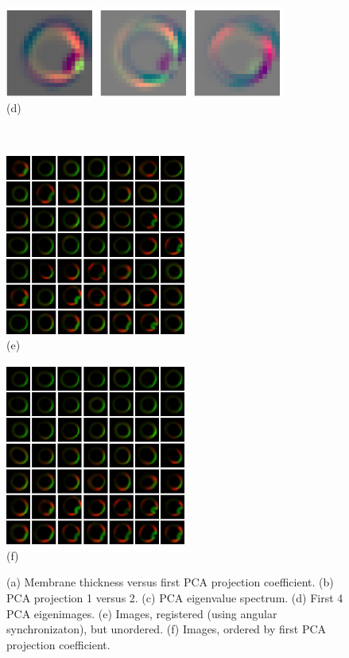 \documentclass[12pt]{article}
\begin{document}
\begin{figure}
\begin{minipage}{12.5cm}
\includegraphics[width=3cm]{eigenimage_2}
\includegraphics[width=3cm]{eigenimage_3}
\includegraphics[width=3cm]{eigenimage_4}\\
(d)
\end{minipage}\\
\begin{minipage}{6.2cm}
\centering
\includegraphics[width=6cm]{image_array}\\
(e)
\end{minipage}
\begin{minipage}{6.2cm}
\centering
\includegraphics[width=6cm]{image_array_ordered}\\
(f)
\end{minipage}
\caption{(a) Membrane thickness versus first PCA projection coefficient. (b) PCA projection 1 versus 2. (c) PCA eigenvalue spectrum. (d) First 4 PCA eigenimages. (e) Images, registered (using angular synchronizaton), but unordered. (f) Images, ordered by first PCA projection coefficient. }
\end{figure}
\end{document}

